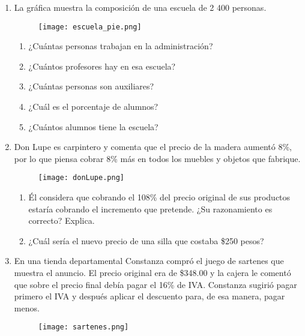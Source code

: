 \begin{enumerate}
    \item La gráfica muestra la composición de una escuela de 2 400 personas.
          \begin{figure}[H]
              \centering
              \texttt{[image: escuela\_pie.png]}
              \label{fig:escuela_pie}
          \end{figure}
          \begin{enumerate}
              \item ¿Cuántas personas trabajan en la administración?
              \item ¿Cuántos profesores hay en esa escuela?
              \item ¿Cuántas personas son auxiliares?
              \item ¿Cuál es el porcentaje de alumnos?
              \item ¿Cuántos alumnos tiene la escuela?
          \end{enumerate}
    \item Don Lupe es carpintero y comenta que el precio de la madera aumentó 8\%, por lo
          que piensa cobrar 8\% más en todos los muebles y objetos que fabrique.
          \begin{figure}[H]
              \centering
              \texttt{[image: donLupe.png]}
              \label{fig:donLupe}
          \end{figure}
          \begin{enumerate}
              \item Él considera que cobrando el 108\% del precio original de sus productos
                    estaría cobrando el incremento que pretende. ¿Su razonamiento es correcto? Explica.
              \item ¿Cuál sería el nuevo precio de una silla que costaba \$250 pesos?
          \end{enumerate}
    \item En una tienda departamental Constanza compró el juego de sartenes que muestra
          el anuncio. El precio original era de \$348.00 y la cajera le comentó que sobre el
          precio final debía pagar el 16\% de IVA. Constanza sugirió pagar primero el IVA y
          después aplicar el descuento para, de esa manera, pagar menos.
          \begin{figure}[H]
              \centering
              \texttt{[image: sartenes.png]}

\end{figure}
\end{enumerate}
